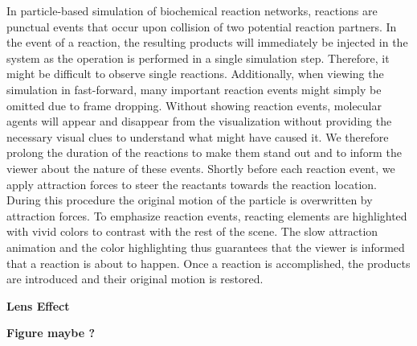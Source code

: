 In particle-based simulation of biochemical reaction networks, reactions are punctual events that occur upon collision of two potential reaction partners.
In the event of a reaction, the resulting products will immediately be injected in the system as the operation is performed in a single simulation step.
Therefore, it might be difficult to observe single reactions.
Additionally, when viewing the simulation in fast-forward, many important reaction events might simply be omitted due to frame dropping.
Without showing reaction events, molecular agents will appear and disappear from the visualization without providing the necessary visual clues to understand what might have caused it.
We therefore prolong the duration of the reactions to make them stand out and to inform the viewer about the nature of these events.
Shortly before each reaction event, we apply attraction forces to steer the reactants towards the reaction location. 
During this procedure the original motion of the particle is overwritten by attraction forces.
To emphasize reaction events, reacting elements are highlighted with vivid colors to contrast with the rest of the scene.
The slow attraction animation and the color highlighting thus guarantees that the viewer is informed that a reaction is about to happen.
Once a reaction is accomplished, the products are introduced and their original motion is restored.

\textbf{Lens Effect}

\textbf{Figure maybe ?}

